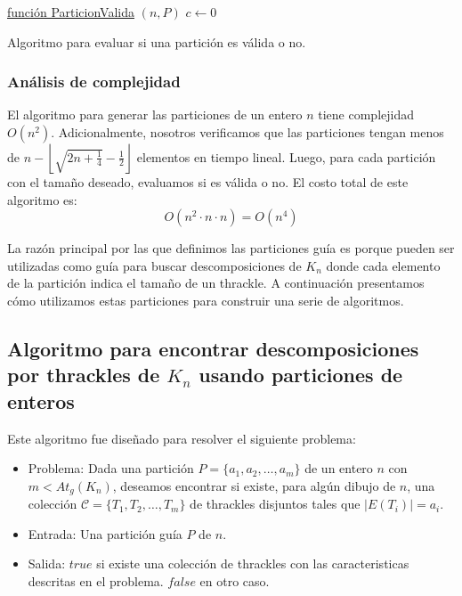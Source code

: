     \begin{algorithm}[htpb]
      \DontPrintSemicolon
      \underline{función ParticionValida} $(n,P)$\;
        $c \gets 0$\;
       \caption{Algoritmo para evaluar si una partición es válida o no.}
       \label{algo:is_partition_valid}
    \end{algorithm}
    \subsubsection{Análisis de complejidad}

    El algoritmo para generar las particiones de un entero $n$ tiene complejidad
    $O(n^2)$. Adicionalmente, nosotros verificamos que las particiones  tengan
    menos de $n - \left\lfloor\sqrt{2n + \frac{1}{4}} - \frac{1}{2}\right\rfloor$
    elementos en tiempo lineal. Luego, para cada partición con el tamaño deseado,
    evaluamos si es válida o no. El costo total de este algoritmo es:
    \[ O(n^2\cdot n \cdot n) = O(n^4)\]

    La razón principal por las que definimos las particiones guía es porque pueden ser utilizadas
    como guía para buscar descomposiciones de $K_n$ donde cada elemento de la partición indica
    el tamaño de un thrackle. A continuación presentamos cómo utilizamos estas particiones
    para construir una serie de algoritmos.

\subsection{Algoritmo para encontrar descomposiciones por thrackles de $K_n$
usando particiones de enteros}\label{secc:descomposiciones_particiones}

Este algoritmo fue diseñado para resolver el siguiente problema:
\begin{itemize}
  \item[] Problema: Dada una partición $P=\{a_1,a_2,\dots,a_m\}$ de un entero $n$ con
  $m < At_g(K_n)$, deseamos encontrar si existe, para algún dibujo de $n$, una colección
  $\mathcal{C}=\{T_1,T_2,\dots,T_m\}$ de thrackles disjuntos tales que $|E(T_i)| = a_i$.
  \item[] Entrada: Una partición guía $P$ de $n$.
  \item[] Salida: $true$ si existe una colección de thrackles con las caracteristicas
  descritas en el problema. $false$ en otro caso.
\end{itemize}

